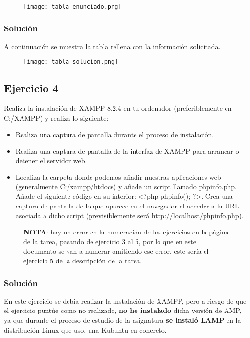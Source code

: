     \begin{figure}[H]
    \centering
    \texttt{[image: tabla-enunciado.png]}
\end{figure}

\subsubsection{Solución}
A continuación se muestra la tabla rellena con la información solicitada.

\begin{figure}[H]
    \centering
    \texttt{[image: tabla-solucion.png]}
\end{figure}

\subsection{Ejercicio 4}
Realiza la instalación de XAMPP 8.2.4 en tu ordenador (preferiblemente en C:/XAMPP) y realiza lo siguiente:

\begin{itemize}
    \item Realiza una captura de pantalla durante el proceso de instalación.
    \item Realiza una captura de pantalla de la interfaz de XAMPP para arrancar o detener el servidor web.
    \item Localiza la carpeta donde podemos añadir nuestras aplicaciones web (generalmente C:/xampp/htdocs) y añade un script llamado phpinfo.php. Añade el siguiente código en su interior: <?php phpinfo(); ?>. Crea una captura de pantalla de lo que aparece en el navegador al acceder a la URL asociada a dicho script (previsiblemente será http://localhost/phpinfo.php).
\end{itemize}

\begin{figure}[H]
    \begin{tcolorbox}[sharp corners, colback=yellow!30, colframe=white!20]
\textbf{NOTA}: hay un error en la numeración de los ejercicios en la página de la tarea, pasando de ejercicio 3 al 5, por lo que en este documento se van a numerar omitiendo ese error, este sería el ejercicio 5 de la descripción de la tarea.
    \end{tcolorbox}
\end{figure}

\subsubsection{Solución}
En este ejercicio se debía realizar la instalación de XAMPP, pero a riesgo de que el ejercicio puntúe como no realizado, \textbf{no he instalado} dicha versión de AMP, ya que durante el proceso de estudio de la asignatura \textbf{se instaló LAMP} en la distribución Linux que uso, una Kubuntu en concreto.

